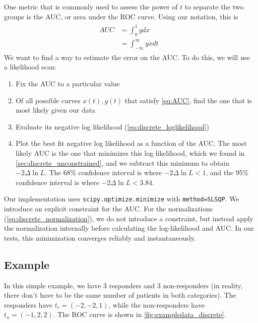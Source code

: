 \documentclass[11pt]{article}
\newcommand{\xdot}{\dot{x}}
\newcommand{\AUC}{AUC}
\begin{document}
One metric that is commonly used to assess the power of \(t\) to separate the two groups is the AUC, or area under the ROC curve.  Using our notation, this is
\begin{align}
	\begin{aligned}
		\AUC&=\int_{0}^{1}ydx\\
		&=\int_{-\infty}^{\infty}y\xdot dt \label{eq:AUC}
	\end{aligned}
\end{align}
We want to find a way to estimate the error on the AUC.  To do this, we will use a likelihood scan:
\begin{enumerate}
	\item Fix the AUC to a particular value
	\item Of all possible curves \(x(t), y(t)\) that satisfy \cref{eq:AUC}, find the one that is most likely given our data
	\item Evaluate its negative log likelihood (\cref{eq:discrete_loglikelihood})
	\item Plot the best fit negative log likelihood as a function of the AUC.  The most likely AUC is the one that minimizes this log likelihood, which we found in \cref{sec:discrete_unconstrained}, and we subtract this minimum to obtain \(-2\Delta\ln{L}\).  The 68\% confidence interval is where \(-2\Delta\ln{L}<1\), and the 95\% confidence interval is where \(-2\Delta\ln{L}<3.84\).
\end{enumerate}

Our implementation uses \texttt{scipy.optimize.minimize} with \texttt{method=SLSQP}.  We introduce an explicit constraint for the AUC.  For the normalizations (\cref{eq:discrete_normalization}), we do not introduce a constraint, but instead apply the normalization internally before calculating the log-likelihood and AUC.  In our tests, this minimization converges reliably and instantaneously.

\subsection{Example}

In this simple example, we have 3 responders and 3 non-responders (in reality, there don't have to be the same number of patients in both categories).  The responders have \(t_r=(-2, -2, 1)\), while the non-responders have \(t_n=(-1, 2, 2)\).  The ROC curve is shown in \cref{fig:exampledata_discrete}.
\end{document}
